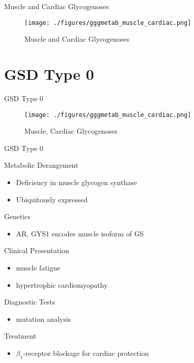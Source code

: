 \documentclass[presentation, smaller]{beamer}
\begin{document}
\begin{frame}[label={sec:orgadeceb1}]{Muscle and Cardiac Glycogenoses}
\begin{figure}[htbp]
\centering
\texttt{[image: ./figures/gggmetab\_muscle\_cardiac.png]}
\caption[Muscle and Cardiac Glycogenoses]{\label{fig:orgf30e5f8}
Muscle and Cardiac Glycogenoses}
\end{figure}
\end{frame}

\section{GSD Type 0}
\label{sec:org06431e3}
\begin{frame}[label={sec:orgd65057d}]{GSD Type 0}
\begin{figure}[htbp]
\centering
\texttt{[image: ./figures/gggmetab\_muscle\_cardiac.png]}
\caption[Muscle, Cardiac Glycogenoses]{\label{fig:orgf41776c}
Muscle, Cardiac Glycogenoses}
\end{figure}
\end{frame}


\begin{frame}[label={sec:org9946010}]{GSD Type 0}
\begin{block}{Metabolic Derangement}
\begin{itemize}
\item Deficiency in muscle glycogen synthase
\item Ubiquitously expressed
\end{itemize}
\end{block}

\begin{block}{Genetics}
\begin{itemize}
\item AR, GYS1 encodes muscle isoform of GS
\end{itemize}
\end{block}

\begin{block}{Clinical Presentation}
\begin{itemize}
\item muscle fatigue
\item hypertrophic cardiomyopathy
\end{itemize}
\end{block}

\begin{block}{Diagnostic Tests}
\begin{itemize}
\item mutation analysis
\end{itemize}
\end{block}
\begin{block}{Treatment}
\begin{itemize}
\item \(\beta_{\text{1}}\)-receptor blockage for cardiac protection
\end{itemize}
\end{block}
\end{frame}
\end{document}
